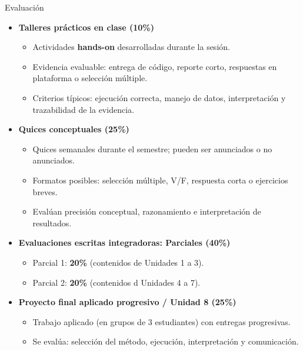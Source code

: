 \documentclass[10pt, xcolor=dvipsnames]{beamer}
\begin{document}
\begin{frame}{Evaluación}
\small
\begin{itemize}
  \item \textbf{Talleres prácticos en clase (10\%)}
  \begin{itemize}
    \item Actividades \textbf{hands-on} desarrolladas durante la sesión.
    \item Evidencia evaluable: entrega de código, reporte corto, respuestas en plataforma o selección múltiple.
    \item Criterios típicos: ejecución correcta, manejo de datos, interpretación y trazabilidad de la evidencia.
  \end{itemize}

  \vspace{0.15cm}

  \item \textbf{Quices conceptuales (25\%)}
  \begin{itemize}
    \item Quices semanales durante el semestre; pueden ser anunciados o no anunciados.
    \item Formatos posibles: selección múltiple, V/F, respuesta corta o ejercicios breves.
    \item Evalúan precisión conceptual, razonamiento e interpretación de resultados.
  \end{itemize}

  \vspace{0.15cm}

  \item \textbf{Evaluaciones escritas integradoras: Parciales (40\%)}
  \begin{itemize}
    \item Parcial 1: \textbf{20\%} (contenidos de Unidades 1 a 3).
    \item Parcial 2: \textbf{20\%} (contenidos d Unidades 4 a 7).
  \end{itemize}

  \vspace{0.15cm}

  \item \textbf{Proyecto final aplicado progresivo / Unidad 8 (25\%)}
  \begin{itemize}
    \item Trabajo aplicado (en grupos de 3 estudiantes) con entregas progresivas.
    \item Se evalúa: selección del método, ejecución, interpretación y comunicación.
  \end{itemize}
\end{itemize}
\end{frame}
\end{document}
